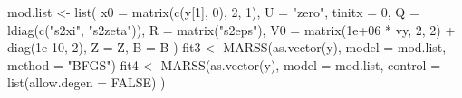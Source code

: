 \begin{Schunk}
\begin{Sinput}
 mod.list <- list(
   x0 = matrix(c(y[1], 0), 2, 1), U = "zero", tinitx = 0,
   Q = ldiag(c("s2xi", "s2zeta")), R = matrix("s2eps"),
   V0 = matrix(1e+06 * vy, 2, 2) + diag(1e-10, 2), Z = Z, B = B
 )
 fit3 <- MARSS(as.vector(y), model = mod.list, method = "BFGS")
 fit4 <- MARSS(as.vector(y),
   model = mod.list,
   control = list(allow.degen = FALSE)
 )
\end{Sinput}
\end{Schunk}
